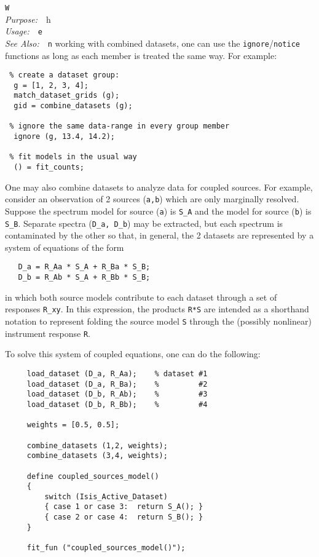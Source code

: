 \documentclass{book}
\makeatletter
\newif\ifpdf
\newenvironment{isisfunction}[4]%
{\index{{#1}@{\tt #1}}%
  \ifpdf
  \else
     \addcontentsline{toc}{subsection}{{#1} -- {#2}}
  \fi
  \vbox{
          \vspace*{\baselineskip}
          {\LARGE\tt #1}\vspace*{\baselineskip}\\
          {{\it Purpose:}~~{#2}}\\
          {{\it Usage:}~~{\tt #3}}\\
          {{\it See Also:}~~{\tt #4}}
       }
}%
{ }
\makeatother
\begin{document}
{\begin{isisfunction}
When working with combined datasets, one can use the
\verb|ignore|/\verb|notice| functions as long as each member is
treated the same way.  For example:

\begin{verbatim}
 % create a dataset group:
  g = [1, 2, 3, 4];
  match_dataset_grids (g);
  gid = combine_datasets (g);

 % ignore the same data-range in every group member
  ignore (g, 13.4, 14.2);

 % fit models in the usual way
  () = fit_counts;
\end{verbatim}

One may also combine datasets to analyze data for coupled
sources.  For example, consider an observation of 2 sources
(\verb|a,b|) which are only marginally resolved.  Suppose the
spectrum model for source (\verb|a|) is \verb|S_A| and
the model for source (\verb|b|) is \verb|S_B|. Separate spectra
(\verb|D_a, D_b|) may be extracted, but each spectrum is
contaminated by the other so that, in general, the 2 datasets
are represented by a system of equations of the form
\begin{verbatim}
   D_a = R_Aa * S_A + R_Ba * S_B;
   D_b = R_Ab * S_A + R_Bb * S_B;
\end{verbatim}
in which both source models contribute to each dataset through
a set of responses \verb|R_xy|. In this expression, the
products \verb|R*S| are intended as a shorthand notation to
represent folding the source model \verb|S| through the
(possibly nonlinear) instrument response \verb|R|.

To solve this system of coupled equations, one can do the
following:

\begin{verbatim}
     load_dataset (D_a, R_Aa);    % dataset #1
     load_dataset (D_a, R_Ba);    %         #2
     load_dataset (D_b, R_Ab);    %         #3
     load_dataset (D_b, R_Bb);    %         #4

     weights = [0.5, 0.5];

     combine_datasets (1,2, weights);
     combine_datasets (3,4, weights);

     define coupled_sources_model()
     {
         switch (Isis_Active_Dataset)
         { case 1 or case 3:  return S_A(); }
         { case 2 or case 4:  return S_B(); }
     }

     fit_fun ("coupled_sources_model()");
\end{verbatim}


\end{isisfunction}}
\end{document}

